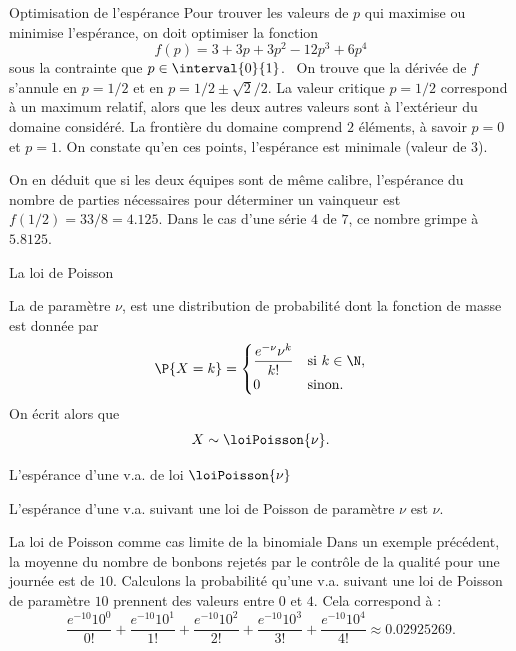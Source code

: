 \documentclass[nuit,charter,pied]{BeamerJS}
\begin{document}
\begin{frame}{Optimisation de l'espérance}
	\small
	Pour trouver les valeurs de $p$ qui maximise ou minimise l'espérance, on doit optimiser la fonction
	\[f(p)=3 + 3 p + 3 p^2 - 12 p^3 + 6 p^4\]
	sous la contrainte que $p\in\interval{0}{1}$.\pause~ On trouve que la dérivée de $f$ s'annule en $p=1/2$ et en $p=1/2\pm \sqrt{2}/2$. La valeur critique $p=1/2$ correspond à un maximum relatif, alors que les deux autres valeurs sont à l'extérieur du domaine considéré. La frontière du domaine comprend $2$ éléments, à savoir $p=0$ et $p=1$. On constate qu'en ces points, l'espérance est minimale (valeur de $3$).
	
	On en déduit que si les deux équipes sont de même calibre, l'espérance du nombre de parties nécessaires pour déterminer un vainqueur est $f(1/2)=33/8=\num{4,125}.$ Dans le cas d'une série $4$ de $7$, ce nombre grimpe à $\num{5,8125}$.
\end{frame}
\begin{frame}{La loi de Poisson}
	\begin{defn}
		La  de paramètre $\nu$, est une distribution de probabilité dont la fonction de masse est donnée par
		\[
		\P{X=k}=\begin{cases} \mathlarger{\frac{e^{-\nu}\nu^k}{k!}} &\text{si}~k\in\N,\\
			0 & \text{sinon}
			.\end{cases}
		\]
		On écrit alors que
		\[X\sim \loiPoisson{\nu}.\]
	\end{defn}
\end{frame}
\begin{frame}[t]{L'espérance d'une v.a. de loi $\loiPoisson{\nu}$}
	\begin{prop}
		L'espérance d'une v.a. suivant une loi de Poisson de paramètre $\nu$ est $\nu$.
	\end{prop}
\end{frame}
\begin{frame}{La loi de Poisson comme cas limite de la binomiale}
	Dans un exemple précédent, la moyenne du nombre de bonbons rejetés par le contrôle de la qualité pour une journée est de $10$. Calculons la probabilité qu'une v.a. suivant une loi de Poisson de paramètre $10$ prennent des valeurs entre $0$ et $4$. Cela correspond à :
	\[\frac{e^{-10}10^0}{0!}+\frac{e^{-10}10^1}{1!}+\frac{e^{-10}10^2}{2!}+\frac{e^{-10}10^3}{3!}+\frac{e^{-10}10^4}{4!}\approx\num{0.02925269}.\]
\end{frame}
\end{document}
